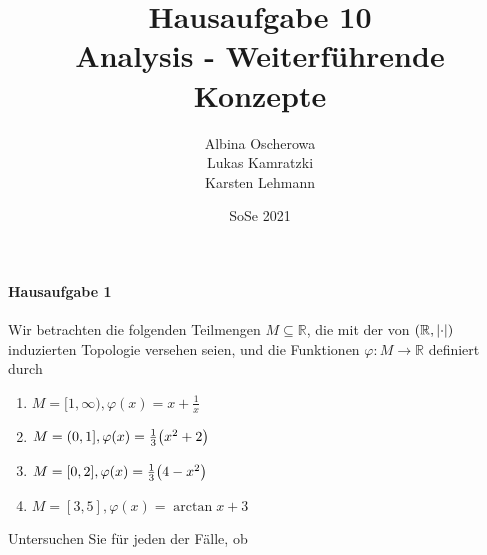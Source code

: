 \documentclass{scrreprt}
\author{Albina Oscherowa \\ Lukas Kamratzki \\ Karsten Lehmann}
\date{SoSe 2021}
\title{Hausaufgabe 10 \\Analysis - Weiterführende Konzepte}
\begin{document}
\paragraph{Hausaufgabe 1} Wir betrachten die folgenden Teilmengen
$M \subseteq \mathbb{R}$, die mit der von $\qty(\mathbb{R}, \abs{\cdot})$
induzierten Topologie versehen seien, und die Funktionen
$\varphi \colon M \to \mathbb{R}$ definiert durch
\begin{multicols}{2}
  \begin{enumerate}[(1)]
  \item $M = [1, \infty), \varphi(x) = x + \frac{1}{x}$
  \item $M = (0, 1], \varphi(x) = \frac{1}{3}\qty\big(x^2 + 2)$
  \item $M = [0, 2], \varphi(x) = \frac{1}{3}\qty\big(4 - x^2)$
  \item $M = [3, 5], \varphi(x) = \arctan x + 3$
  \end{enumerate}
\end{multicols}
Untersuchen Sie für jeden der Fälle, ob
\end{document}
